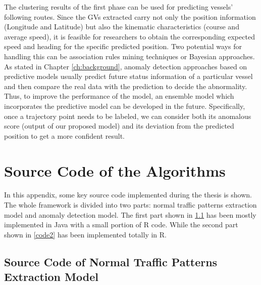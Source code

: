 \documentclass[12pt,glossary]{dalcsthesis}
\begin{document}
The clustering results of the first phase can be used for predicting vessels' following routes. Since the GVs extracted carry not only the position information (Longitude and Latitude) but also the kinematic characteristics (course and average speed), it is feasible for researchers to obtain the corresponding expected speed and heading for the specific predicted position. Two potential ways for handling this can be association rules mining techniques or Bayesian approaches. As stated in Chapter \ref{ch:background}, anomaly detection approaches based on predictive models usually predict future status information of a particular vessel and then compare the real data with the prediction to decide the abnormality. Thus, to improve the performance of the model, an ensemble model which incorporates the predictive model can be developed in the future. Specifically, once a trajectory point needs to be labeled, we can consider both its anomalous score (output of our proposed model) and its deviation from the predicted position to get a more confident result. 












\appendix

\chapter{Source Code of the Algorithms}

In this appendix, some key source code implemented during the thesis is shown. The whole framework is divided into two parts: normal traffic patterns extraction model and anomaly detection model. The first part shown in \ref{code1} has been mostly implemented in Java with a small portion of R code. While the second part shown in \ref{code2} has been implemented totally in R. 

\section{Source Code of Normal Traffic Patterns Extraction Model}
\label{code1}
\end{document}
